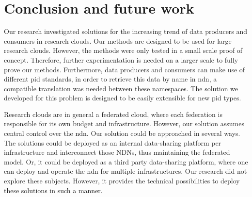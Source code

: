 \section{Conclusion and future work}
\label{fut}
\label{conc}












Our research investigated solutions for the increasing trend of data producers and consumers in research clouds. Our methods are designed to be used for large research clouds. However, the methods were only tested in a small scale proof of concept. Therefore, further experimentation is needed on a larger scale to fully prove our methods. Furthermore, data producers and consumers can make use of different \gls{pid} standards, in order to retrieve this data by name in \gls{ndn}, a compatible translation was needed between these namespaces. The solution we developed for this problem is designed to be easily extensible for new \gls{pid} types. 

Research clouds are in general a federated cloud, where each federation is responsible for its own budget and infrastructure. However, our solution assumes central control over the \gls{ndn}. Our solution could be approached in several ways. The solutions could be deployed as an internal data-sharing platform per infrastructure and interconnect those NDNs, thus maintaining the federated model. Or, it could be deployed as a third party data-sharing platform, where one can deploy and operate the \gls{ndn} for multiple infrastructures. Our research did not explore these subjects. However, it provides the technical possibilities to deploy these solutions in such a manner.

